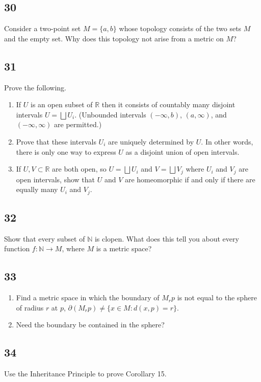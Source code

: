 \documentclass{amsart}
\begin{document}
\subsection*{30}
Consider a two-point set $M = \{a,b\}$ whose topology consists of the two sets $M$ and the empty set. Why does this topology not arise from a metric on $M$?

\subsection*{31}
Prove the following.
\begin{enumerate}[label=(\alph*)]
\item If $U$ is an open subset of $\mathbb{R}$ then it consists of countably many disjoint intervals $U = \bigsqcup U_i$. (Unbounded intervals $(-\infty,b)$, $(a,\infty)$, and $(-\infty,\infty)$ are permitted.)
\item Prove that these intervals $U_i$ are uniquely determined by $U$. In other words, there is only one way to express $U$ as a disjoint union of open intervals.
\item If $U, V \subset \mathbb{R}$ are both open, so $U = \bigsqcup U_i$ and $V = \bigsqcup V_j$ where $U_i$ and $V_j$ are open intervals, show that $U$ and $V$ are homeomorphic if and only if there are equally many $U_i$ and $V_j$.
\end{enumerate}

\subsection*{32}
Show that every subset of $\mathbb{N}$ is clopen. What does this tell you about every function $f : \mathbb{N} \to M$, where $M$ is a metric space?

\subsection*{33}
\begin{enumerate}[label=(\alph*)]
\item Find a metric space in which the boundary of $M_r p$ is not equal to the sphere of radius $r$ at $p$, $\partial(M_r p) \ne \{x \in M : d(x,p) = r\}$.
\item Need the boundary be contained in the sphere?
\end{enumerate}

\subsection*{34}
Use the Inheritance Principle to prove Corollary 15.
\end{document}
